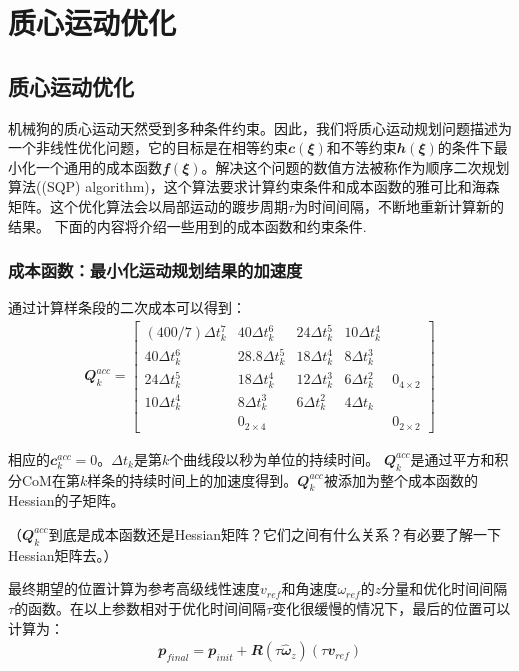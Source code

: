 
\chapter{质心运动优化}
\section{质心运动优化}

机械狗的质心运动天然受到多种条件约束。因此，我们将质心运动规划问题描述为一个非线性优化问题，它的目标是在相等约束${\mathbfit c}({\mathbfit \xi})$和不等约束${\mathbfit h}({\mathbfit \xi})$的条件下最小化一个通用的成本函数${\mathbfit f}({\mathbfit \xi})$。解决这个问题的数值方法被称作为顺序二次规划算法((SQP) algorithm)，这个算法要求计算约束条件和成本函数的雅可比和海森矩阵。这个优化算法会以局部运动的踱步周期$\tau$为时间间隔，不断地重新计算新的结果。
下面的内容将介绍一些用到的成本函数和约束条件.

\subsection{成本函数：最小化运动规划结果的加速度}
通过计算样条段的二次成本可以得到：
\begin{align}
    {\mathbfit Q}_k^{acc} = 
    \begin{bmatrix}
    (400/7)\Delta t_k^7 & 40\Delta t_k^6 & 24\Delta t_k^5 & 10\Delta t_k^4 & \\
    40\Delta t_k^6 & 28.8\Delta t_k^5 & 18\Delta t_k^4 & 8\Delta t_k^3 & \\
    24\Delta t_k^5 & 18\Delta t_k^4 & 12\Delta t_k^3 & 6\Delta t_k^2 & {\mathbfit 0}_{4\times 2}\\
    10\Delta t_k^4 & 8\Delta t_k^3 & 6\Delta t_k^2 & 4\Delta t_k &\\
     & {\mathbfit 0}_{2\times 4} & & & {\mathbfit 0}_{2\times 2}
    \end{bmatrix}
\end{align}


相应的${\mathbfit c}_k^{acc}=0$。$\Delta t_k$是第$k$个曲线段以秒为单位的持续时间。
${\mathbfit Q}_k^{acc}$是通过平方和积分CoM在第$k$样条的持续时间上的加速度得到。${\mathbfit Q}_k^{acc}$被添加为整个成本函数的Hessian的子矩阵。
\begin{note}
    （${\mathbfit Q}_k^{acc}$到底是成本函数还是Hessian矩阵？它们之间有什么关系？有必要了解一下Hessian矩阵去。）
\end{note}

最终期望的位置计算为参考高级线性速度$v_{ref}$和角速度$\omega_{ref}$的$z$分量和优化时间间隔$\tau$的函数。在以上参数相对于优化时间间隔$\tau$变化很缓慢的情况下，最后的位置可以计算为：
\begin{align}
    {\mathbfit p}_{final} = {\mathbfit p}_{init} + {\mathbfit R}(\tau \hat {\mathbfit \omega}_z)(\tau {\mathbfit v}_{ref})
\end{align}

